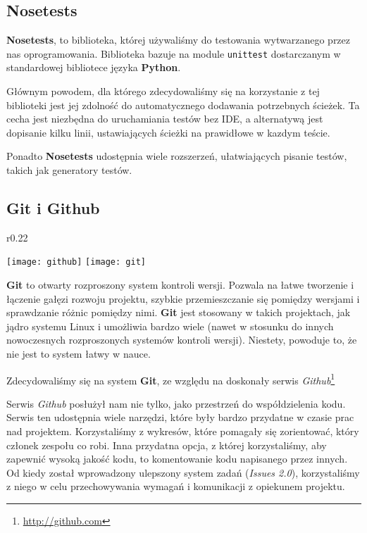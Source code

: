 \subsection{Nosetests}
\textbf{Nosetests}, to biblioteka, której używaliśmy do testowania wytwarzanego przez nas oprogramowania.
Biblioteka bazuje na module \texttt{unittest} dostarczanym w standardowej bibliotece języka \textbf{Python}.

Głównym powodem, dla którego zdecydowaliśmy się na korzystanie z tej biblioteki jest jej zdolność do automatycznego dodawania potrzebnych ścieżek.
Ta cecha jest niezbędna do uruchamiania testów bez IDE, a alternatywą jest dopisanie kilku linii, ustawiających ścieżki na prawidłowe w kazdym teście.

Ponadto \textbf{Nosetests} udostępnia wiele rozszerzeń, ułatwiających pisanie testów, takich jak generatory testów.

\subsection{Git i Github}
\begin{wrapfigure}{r}{0.22\textwidth}
  \begin{center}
    \texttt{[image: github]}
    \texttt{[image: git]}
  \end{center}
\end{wrapfigure}
\textbf{Git} to otwarty rozproszony system kontroli wersji.
Pozwala na łatwe tworzenie i łączenie gałęzi rozwoju projektu, szybkie przemieszczanie się pomiędzy wersjami i sprawdzanie różnic pomiędzy nimi.
\textbf{Git} jest stosowany w takich projektach, jak jądro systemu Linux i umożliwia bardzo wiele (nawet w stosunku do innych nowoczesnych rozproszonych systemów kontroli wersji).
Niestety, powoduje to, że nie jest to system łatwy w nauce.

Zdecydowaliśmy się na system \textbf{Git}, ze względu na doskonały serwis \emph{Github}\footnote{\url{http://github.com}}

Serwis \emph{Github} posłużył nam nie tylko, jako przestrzeń do współdzielenia kodu.
Serwis ten udostępnia wiele narzędzi, które były bardzo przydatne w czasie prac nad projektem.
Korzystaliśmy z wykresów, które pomagały się zorientować, który członek zespołu co robi.
Inna przydatna opcja, z której korzystaliśmy, aby zapewnić wysoką jakość kodu, to komentowanie kodu napisanego przez innych.
Od kiedy został wprowadzony ulepszony system zadań (\emph{Issues 2.0}), korzystaliśmy z niego w celu przechowywania wymagań i komunikacji z opiekunem projektu.

